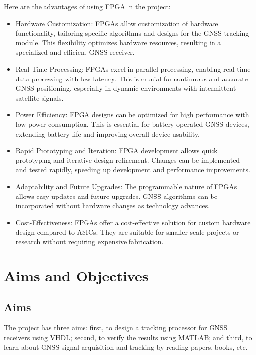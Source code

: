 Here are the advantages of using FPGA in the project:
\begin{itemize}
    \item Hardware Customization: FPGAs allow customization of hardware functionality, tailoring specific algorithms and designs for the GNSS tracking module. This flexibility optimizes hardware resources, resulting in a specialized and efficient GNSS receiver.
    \item Real-Time Processing: FPGAs excel in parallel processing, enabling real-time data processing with low latency. This is crucial for continuous and accurate GNSS positioning, especially in dynamic environments with intermittent satellite signals.
    \item Power Efficiency: FPGA designs can be optimized for high performance with low power consumption. This is essential for battery-operated GNSS devices, extending battery life and improving overall device usability.
    \item Rapid Prototyping and Iteration: FPGA development allows quick prototyping and iterative design refinement. Changes can be implemented and tested rapidly, speeding up development and performance improvements.
    \item Adaptability and Future Upgrades: The programmable nature of FPGAs allows easy updates and future upgrades. GNSS algorithms can be incorporated without hardware changes as technology advances.
    \item Cost-Effectiveness: FPGAs offer a cost-effective solution for custom hardware design compared to ASICs. They are suitable for smaller-scale projects or research without requiring expensive fabrication.
\end{itemize}


\section{Aims and Objectives}
\subsection{Aims}
The project has three aims: first, to design a tracking processor for GNSS receivers using VHDL; second, to verify the results using MATLAB; and third, to learn about GNSS signal acquisition and tracking by reading papers, books, etc.

